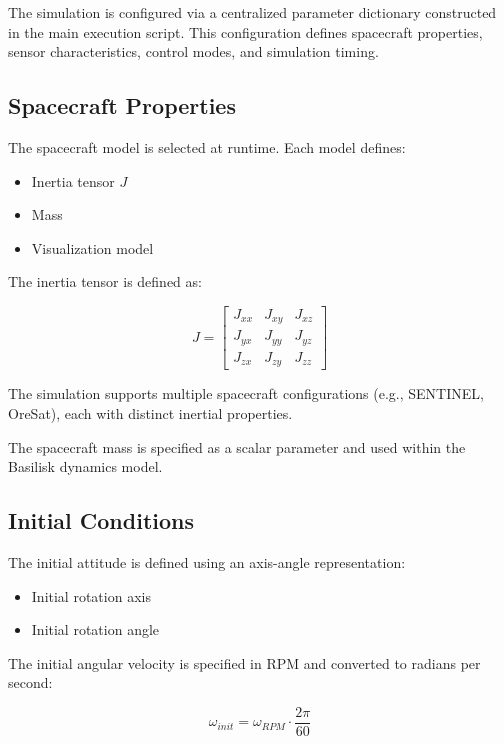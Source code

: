 The simulation is configured via a centralized parameter dictionary constructed in the main execution script. This configuration defines spacecraft properties, sensor characteristics, control modes, and simulation timing.

\subsection{Spacecraft Properties}

The spacecraft model is selected at runtime. Each model defines:

\begin{itemize}
	\item Inertia tensor $J$
	\item Mass
	\item Visualization model
\end{itemize}

The inertia tensor is defined as:

\[
J =
\begin{bmatrix}
	J_{xx} & J_{xy} & J_{xz} \\
	J_{yx} & J_{yy} & J_{yz} \\
	J_{zx} & J_{zy} & J_{zz}
\end{bmatrix}
\]

The simulation supports multiple spacecraft configurations (e.g., SENTINEL, OreSat), each with distinct inertial properties.

\vspace{0.5em}

The spacecraft mass is specified as a scalar parameter and used within the Basilisk dynamics model.

\subsection{Initial Conditions}

The initial attitude is defined using an axis-angle representation:

\begin{itemize}
	\item Initial rotation axis
	\item Initial rotation angle
\end{itemize}

The initial angular velocity is specified in RPM and converted to radians per second:

\[
\omega_{init} = \omega_{RPM} \cdot \frac{2\pi}{60}
\]

